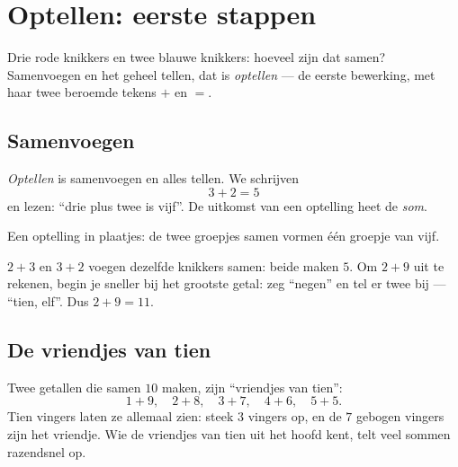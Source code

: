 \chapter{Optellen: eerste stappen}\label{ch:g1:addition}

Drie rode knikkers en twee blauwe knikkers: hoeveel zijn dat samen?
Samenvoegen en het geheel tellen, dat is \emph{optellen} --- de eerste
bewerking, met haar twee beroemde tekens $+$ en $=$.

\section{Samenvoegen}

\begin{definition}[Optellen]\label{def:g1:addition:def}
\emph{Optellen} is samenvoegen en alles tellen. We schrijven
\[
3 + 2 = 5
\]
en lezen: ``drie plus twee is vijf''. De uitkomst van een optelling
heet de \emph{som}.
\end{definition}

\begin{omfigure}

{\small Een optelling in plaatjes: de twee groepjes samen vormen één
groepje van vijf.}
\end{omfigure}

\begin{example}\label{ex:g1:addition:order}
$2 + 3$ en $3 + 2$ voegen dezelfde knikkers samen: beide maken $5$. Om
$2 + 9$ uit te rekenen, begin je sneller bij het grootste getal: zeg
``negen'' en tel er twee bij --- ``tien, elf''. Dus $2 + 9 = 11$.
\end{example}

\section{De vriendjes van tien}

\begin{example}\label{ex:g1:addition:friends}
Twee getallen die samen $10$ maken, zijn ``vriendjes van tien'':
\[
1 + 9, \quad 2 + 8, \quad 3 + 7, \quad 4 + 6, \quad 5 + 5 .
\]
Tien vingers laten ze allemaal zien: steek $3$ vingers op, en de $7$
gebogen vingers zijn het vriendje. Wie de vriendjes van tien uit het
hoofd kent, telt veel sommen razendsnel op.
\end{example}

